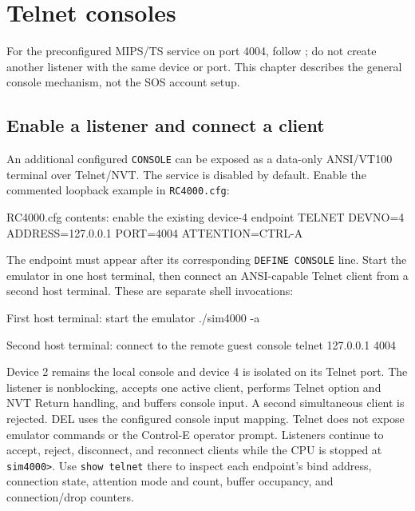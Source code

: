 \chapter{Telnet consoles}\label{telnet-consoles}
For the preconfigured MIPS/TS service on port 4004, follow
; do not create another
listener with the same device or port. This chapter describes the general
console mechanism, not the SOS account setup.

\section{Enable a listener and connect a client}\label{enable-a-listener-and-connect-a-client}

An additional configured \passthrough{\lstinline!CONSOLE!} can be exposed as a data-only ANSI/VT100 terminal over Telnet/NVT. The service is disabled by default. Enable the commented loopback example in \passthrough{\lstinline!RC4000.cfg!}:

\begin{commandexample}{RC4000.cfg contents: enable the existing device-4 endpoint}
TELNET DEVNO=4 ADDRESS=127.0.0.1 PORT=4004 ATTENTION=CTRL-A
\end{commandexample}

The endpoint must appear after its corresponding \passthrough{\lstinline!DEFINE CONSOLE!} line. Start the emulator in one host terminal, then connect an ANSI-capable Telnet client from a second host terminal. These are separate shell invocations:

\begin{commandexample}[language=sh]{First host terminal: start the emulator}
./sim4000 -a
\end{commandexample}

\begin{commandexample}[language=sh]{Second host terminal: connect to the remote guest console}
telnet 127.0.0.1 4004
\end{commandexample}

Device 2 remains the local console and device 4 is isolated on its Telnet port. The listener is nonblocking, accepts one active client, performs Telnet option and NVT Return handling, and buffers console input. A second simultaneous client is rejected. DEL uses the configured console input mapping. Telnet does not expose emulator commands or the Control-E operator prompt. Listeners continue to accept, reject, disconnect, and reconnect clients while the CPU is stopped at \passthrough{\lstinline!sim4000>!}. Use \passthrough{\lstinline!show telnet!} there to inspect each endpoint's bind address, connection state, attention mode and count, buffer occupancy, and connection/drop counters.

